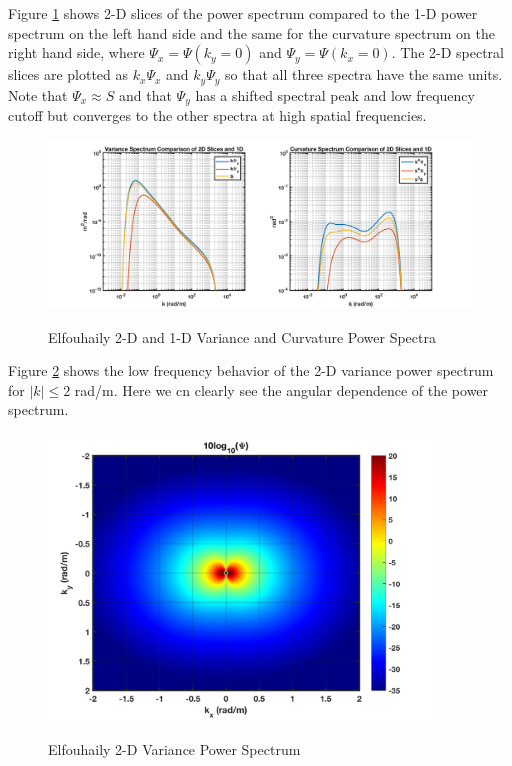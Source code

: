 Figure \ref{os_fig:7bc} shows 2-D slices of the power spectrum compared to the 1-D power spectrum on the left hand side and the same for the curvature spectrum on the right hand side, where $\Psi_x = \Psi(k_y = 0)$ and $\Psi_y = \Psi(k_x = 0)$. The 2-D spectral slices are plotted as $k_x\Psi_x$ and $k_y\Psi_y$ so that all three spectra have the same units. Note that $\Psi_x \approx S$ and that $\Psi_y$ has a shifted spectral peak and low frequency cutoff but converges to the other spectra at high spatial frequencies.
\begin{figure}[H]
  \begin{center}
\includegraphics[width=6in]{../media/Ocean_Surface/elf_variance_curvature_spectrum_2D_slices.png}
  \end{center}
  \renewcommand{\baselinestretch}{1} \small\normalsize
  \begin{quote}
    \caption[Elfouhaily 2-D and 1D Variance and Curvature Power Spectra]{Elfouhaily 2-D and 1-D Variance and Curvature Power Spectra\label{os_fig:7bc}}
  \end{quote}
\end{figure}
\renewcommand{\baselinestretch}{2} \small\normalsize

Figure \ref{os_fig:7cc} shows the low frequency behavior of the 2-D variance power spectrum for $|k| \leq 2$ rad/m. Here we cn clearly see the angular dependence of the power spectrum.
\begin{figure}[H]
  \begin{center}
\includegraphics[width=4in]{../media/Ocean_Surface/elf_variance_spectrum_2D_zoom.png}
  \end{center}
  \renewcommand{\baselinestretch}{1} \small\normalsize
  \begin{quote}
    \caption[Elfouhaily 2-D Variance Power Spectrum]{Elfouhaily 2-D Variance Power Spectrum\label{os_fig:7cc}}
  \end{quote}
\end{figure}
\renewcommand{\baselinestretch}{2} \small\normalsize

